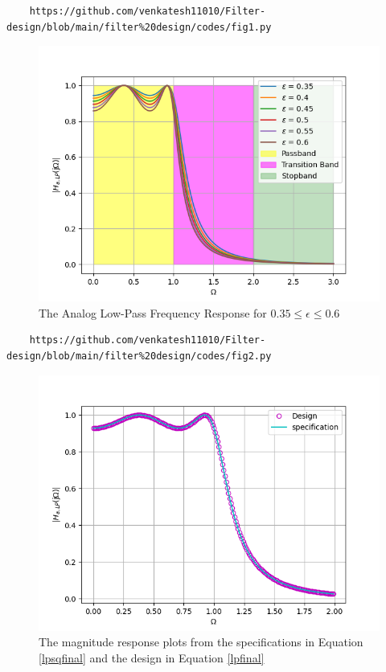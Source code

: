 \documentclass{article}
\begin{document}
\begin{lstlisting}
	https://github.com/venkatesh11010/Filter-design/blob/main/filter%20design/codes/fig1.py
\end{lstlisting}
\begin{figure}[H]
\includegraphics[width = \columnwidth]{figs/fig1.png}
\caption{The Analog Low-Pass Frequency Response for $0.35 \leq \epsilon \leq 0.6$}
\label{fig2}
\end{figure}
\begin{lstlisting}
	https://github.com/venkatesh11010/Filter-design/blob/main/filter%20design/codes/fig2.py
\end{lstlisting}
\begin{figure}[H]
\includegraphics[width = \columnwidth]{figs/fig2.png}
\caption{The magnitude response plots from the specifications in Equation \ref{lpsqfinal} and the design in Equation \ref{lpfinal}}
\label{fig3}
\end{figure}
\end{document}
